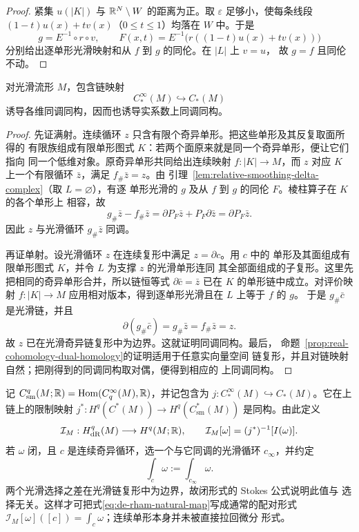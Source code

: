 \begin{proof}
紧集 $u(|K|)$ 与 $\mathbb{R}^N\setminus W$ 的距离为正。取
$\varepsilon$ 足够小，使每条线段
$(1-t)u(x)+tv(x)$（$0\leq t\leq1$）均落在 $W$ 中。于是
\[
 g=E^{-1}\circ r\circ v,\qquad
 F(x,t)=E^{-1}\bigl(r((1-t)u(x)+tv(x))\bigr)
\]
分别给出逐单形光滑映射和从 $f$ 到 $g$ 的同伦。在 $|L|$ 上 $v=u$，
故 $g=f$ 且同伦不动。
\end{proof}

\begin{theorem}[光滑奇异链比较]\label{thm:smooth-singular-comparison}
对光滑流形 $M$，包含链映射
\[
 C_*^\infty(M)\hookrightarrow C_*(M)
\]
诱导各维同调同构，因而也诱导实系数上同调同构。
\end{theorem}
\begin{proof}
先证满射。连续循环 $z$ 只含有限个奇异单形。把这些单形及其反复取面所得的
有限族组成有限单形图式 $K$：若两个面原来就是同一个奇异单形，便让它们指向
同一个低维对象。原奇异单形共同给出连续映射 $f:|K|\to M$，而 $z$
对应 $K$ 上一个有限循环 $\bar z$，满足 $f_\#\bar z=z$。由
引理~\ref{lem:relative-smoothing-delta-complex}（取 $L=\varnothing$），有逐
单形光滑的 $g$ 及从 $f$ 到 $g$ 的同伦 $F$。棱柱算子在 $K$ 的各个单形上
相容，故
\[
 g_\#\bar z-f_\#\bar z
 =\partial P_F\bar z+P_F\partial\bar z
 =\partial P_F\bar z.
\]
因此 $z$ 与光滑循环 $g_\#\bar z$ 同调。

再证单射。设光滑循环 $z$ 在连续复形中满足 $z=\partial c$。用 $c$ 中的
单形及其面组成有限单形图式 $K$，并令 $L$ 为支撑 $z$ 的光滑单形连同
其全部面组成的子复形。这里先把相同的奇异单形合并，所以链恒等式
$\partial\bar c=\bar z$ 已在 $K$ 的单形链中成立。对评价映射
$f:|K|\to M$ 应用相对版本，得到逐单形光滑且在 $L$ 上等于 $f$ 的 $g$。
于是 $g_\#\bar c$ 是光滑链，并且
\[
 \partial(g_\#\bar c)=g_\#\bar z=f_\#\bar z=z.
\]
故 $z$ 已在光滑奇异链复形中为边界。这就证明同调同构。最后，
命题~\ref{prop:real-cohomology-dual-homology}的证明适用于任意实向量空间
链复形，并且对链映射自然；把刚得到的同调同构取对偶，便得到相应的
上同调同构。
\end{proof}

记 $C_{\mathrm{sm}}^q(M;\mathbb{R})=\operatorname{Hom}(C_q^\infty(M),\mathbb{R})$，并记包含为
$j:C_*^\infty(M)\hookrightarrow C_*(M)$。它在上链上的限制映射
$j^*:H^q(C^*(M))\to H^q(C_{\mathrm{sm}}^*(M))$ 是同构。由此定义
\begin{equation}\label{eq:de-rham-natural-map}
 \mathcal I_M:H_{\mathrm{dR}}^q(M)\longrightarrow H^q(M;\mathbb{R}),
 \qquad
 \mathcal I_M[\omega]=(j^*)^{-1}[I(\omega)].
\end{equation}
若 $\omega$ 闭，且 $c$ 是连续奇异循环，选一个与它同调的光滑循环
$c_\infty$，并约定
\[
 \int_c\omega:=\int_{c_\infty}\omega.
\]
两个光滑选择之差在光滑链复形中为边界，故闭形式的 Stokes 公式说明此值与
选择无关。这样才可把式\eqref{eq:de-rham-natural-map}写成通常的配对形式
$\mathcal I_M[\omega]([c])=\int_c\omega$；连续单形本身并未被直接拉回微分
形式。

